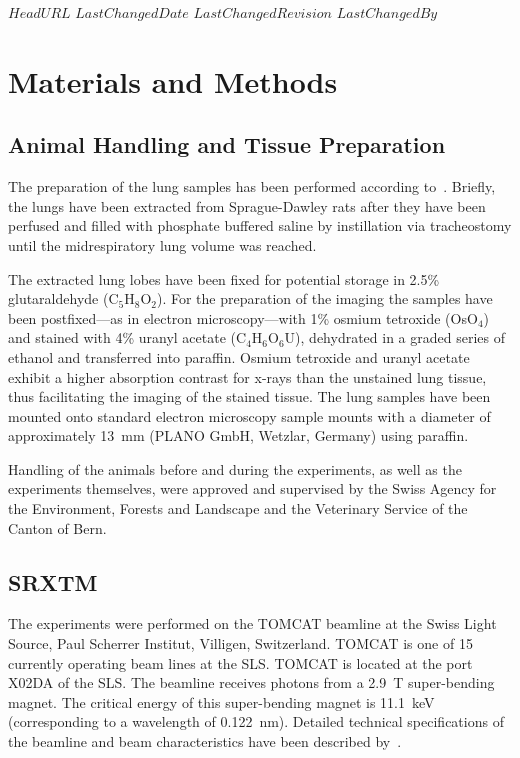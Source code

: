 \svnidlong
{$HeadURL$}
{$LastChangedDate$}
{$LastChangedRevision$}
{$LastChangedBy$}
\section{Materials and Methods}
\label{sec:materials and methods}
\subsection{Animal Handling and Tissue Preparation}
The preparation of the lung samples has been performed according to~\citet{Schittny1997,Schittny1998}. Briefly, the lungs have been extracted from Sprague-Dawley rats after they have been perfused and filled with phosphate buffered saline by instillation via tracheostomy until the midrespiratory lung volume was reached.

The extracted lung lobes have been fixed for potential storage in 2.5\% glutaraldehyde (C$_5$H$_8$O$_2$). For the preparation of the imaging the samples have been postfixed---as in electron microscopy---with 1\% osmium tetroxide (OsO$_4$) and stained with 4\% uranyl acetate (C$_4$H$_6$O$_6$U), dehydrated in a graded series of ethanol and transferred into paraffin.  Osmium tetroxide and uranyl acetate exhibit a higher absorption contrast for x-rays than the unstained lung tissue, thus facilitating the imaging of the stained tissue. The lung samples have been mounted onto standard electron microscopy sample mounts with a diameter of approximately \SI{13}{\milli\meter} (PLANO GmbH, Wetzlar, Germany) using paraffin.

Handling of the animals before and during the experiments, as well as the experiments themselves, were approved and supervised by the Swiss Agency for the Environment, Forests and Landscape and the Veterinary Service of the Canton of Bern.

\subsection{SRXTM}
The experiments were performed on the TOMCAT beamline at the Swiss Light Source, Paul Scherrer Institut, Villigen, Switzerland. TOMCAT is one of 15 currently operating beam lines at the SLS. TOMCAT is located at the port X02DA of the SLS. The beamline receives photons from a \SI{2.9}{\tesla} super-bending magnet. The critical energy of this super-bending magnet is \SI{11.1}{\kilo\electronvolt} (corresponding to a wavelength of \SI{0.122}{\nano\meter}). Detailed technical specifications of the beamline and beam characteristics have been described by~\citet{Stampanoni2006a,Stampanoni2007}.

